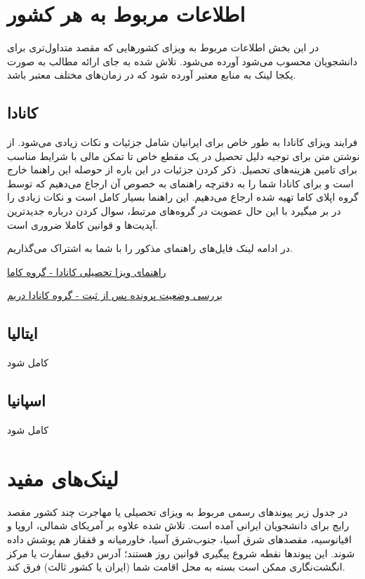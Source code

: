 \section{اطلاعات مربوط به هر کشور}
در این بخش اطلاعات مربوط به ویزای کشور‌هایی که مقصد متداول‌تری برای دانشجویان محسوب می‌شود آورده می‌شود. تلاش شده به جای ارائه مطالب به صورت 
یکجا لینک به منابع معتبر آورده شود که در زمان‌های مختلف معتبر باشد. 


\subsection{کانادا}
فرایند ویزای کانادا به طور خاص برای ایرانیان شامل جزئیات و نکات زیادی می‌شود. از نوشتن متن  برای توجیه دلیل 
تحصیل در یک مقطع خاص تا تمکن مالی با شرایط مناسب برای تامین هزینه‌های تحصیل. ذکر کردن جزئیات در این باره از حوصله این راهنما خارج است 
و برای کانادا شما را به دفترچه راهنمای به خصوص آن ارجاع می‌دهیم که توسط گروه اپلای کاما تهیه شده ارجاع می‌دهیم. این راهنما بسیار کامل است و 
نکات زیادی را در بر میگیرد با این حال عضویت در گروه‌های مرتبط، سوال کردن درباره جدیدترین آپدیت‌ها و قوانین کاملا ضروری است. 

در ادامه لینک فایل‌های راهنمای مذکور را با شما به اشتراک می‌گذاریم. 

\href{https://github.com/farbodbj/ApplyWay/blob/master/assets/canada-visa/study-permit-temporary-stay.pdf}{راهنمای ویزا تحصیلی کانادا - گروه کاما}

\href{https://github.com/farbodbj/ApplyWay/blob/master/assets/canada-visa/tracking-your-application.pdf}{بررسی وضعیت پرونده پس از ثبت - گروه کانادا دریم}

\subsection{ایتالیا}
کامل شود

\subsection{اسپانیا}
کامل شود


\section{لینک‌های مفید}
\label{sec:visa-useful-links}
در جدول زیر پیوندهای رسمی مربوط به ویزای تحصیلی یا مهاجرت چند کشور مقصد رایج برای دانشجویان ایرانی
آمده است. تلاش شده علاوه بر آمریکای شمالی، اروپا و اقیانوسیه، مقصدهای شرق آسیا، جنوب‌شرق آسیا،
خاورمیانه و قفقاز هم پوشش داده شوند. این پیوندها نقطه شروع پیگیری قوانین روز هستند؛ آدرس دقیق
سفارت یا مرکز انگشت‌نگاری ممکن است بسته به محل اقامت شما (ایران یا کشور ثالث) فرق کند.

